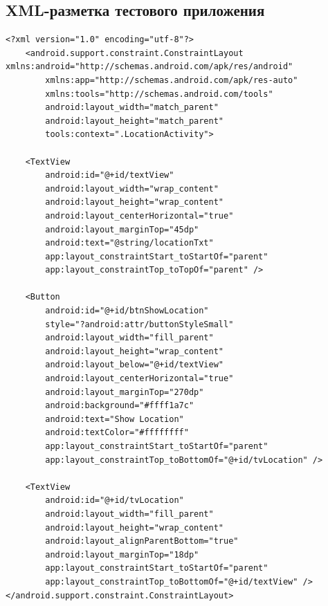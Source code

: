 \documentclass[a4paper,12pt]{article}
\begin{document}
\subsection{XML-разметка тестового приложения}
\begin{lstlisting}
<?xml version="1.0" encoding="utf-8"?>
	<android.support.constraint.ConstraintLayout xmlns:android="http://schemas.android.com/apk/res/android"
		xmlns:app="http://schemas.android.com/apk/res-auto"
		xmlns:tools="http://schemas.android.com/tools"
		android:layout_width="match_parent"
		android:layout_height="match_parent"
		tools:context=".LocationActivity">
		
	<TextView
		android:id="@+id/textView"
		android:layout_width="wrap_content"
		android:layout_height="wrap_content"
		android:layout_centerHorizontal="true"
		android:layout_marginTop="45dp"
		android:text="@string/locationTxt"
		app:layout_constraintStart_toStartOf="parent"
		app:layout_constraintTop_toTopOf="parent" />
	
	<Button
		android:id="@+id/btnShowLocation"
		style="?android:attr/buttonStyleSmall"
		android:layout_width="fill_parent"
		android:layout_height="wrap_content"
		android:layout_below="@+id/textView"
		android:layout_centerHorizontal="true"
		android:layout_marginTop="270dp"
		android:background="#ffff1a7c"
		android:text="Show Location"
		android:textColor="#ffffffff"
		app:layout_constraintStart_toStartOf="parent"
		app:layout_constraintTop_toBottomOf="@+id/tvLocation" />
	
	<TextView
		android:id="@+id/tvLocation"
		android:layout_width="fill_parent"
		android:layout_height="wrap_content"
		android:layout_alignParentBottom="true"
		android:layout_marginTop="18dp"
		app:layout_constraintStart_toStartOf="parent"
		app:layout_constraintTop_toBottomOf="@+id/textView" />
</android.support.constraint.ConstraintLayout>
\end{lstlisting}
\pagebreak
\end{document}
